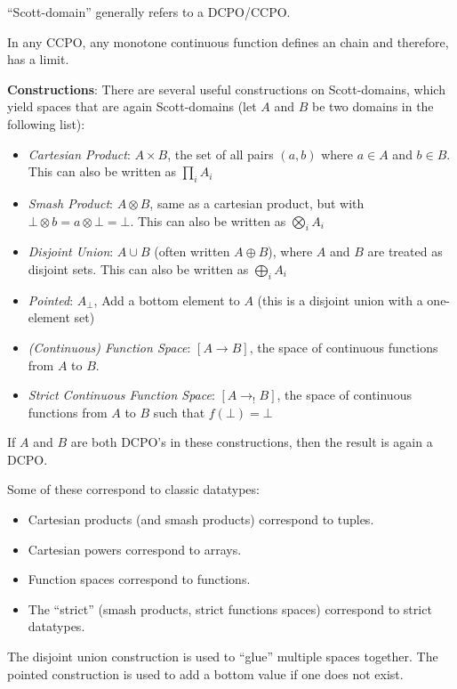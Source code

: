 \documentclass{article}
\begin{document}
``Scott-domain'' generally refers to a DCPO/CCPO.

In any CCPO, any monotone continuous function defines an chain and
therefore, has a limit.

\textbf{Constructions}: There are several useful
constructions on Scott-domains, which yield spaces that are again
Scott-domains (let $A$ and $B$ be two domains in the following list):
\begin{itemize}
  \item \emph{Cartesian Product}: $A \times B$, the set of all pairs
    $(a, b)$ where $a\in A$ and $b\in B$.  This can also be written as
    $\prod_iA_i$
  \item \emph{Smash Product}: $A \otimes B$, same as a cartesian
    product, but with $\bot \otimes b = a \otimes \bot = \bot$.  This
    can also be written as $\bigotimes_iA_i$
  \item \emph{Disjoint Union}: $A \cup B$ (often written $A \oplus
    B$), where $A$ and $B$ are treated as disjoint
    sets.  This can also be written as $\bigoplus_iA_i$
  \item \emph{Pointed}: $A_{\bot}$, Add a bottom element to $A$ (this
    is a disjoint union with a one-element set)
  \item \emph{(Continuous) Function Space}: $[A \rightarrow B]$, the
    space of continuous functions from $A$ to $B$.
  \item \emph{Strict Continuous Function Space}: $[A \rightarrow_{!} B]$,
    the space of continuous functions from $A$ to $B$ such that
    $f(\bot) = \bot$
\end{itemize}
If $A$ and $B$ are both DCPO's in these constructions, then the result
is again a DCPO.

Some of these correspond to classic datatypes:
\begin{itemize}
  \item Cartesian products (and smash products) correspond to tuples.
  \item Cartesian powers correspond to arrays.
  \item Function spaces correspond to functions.
  \item The ``strict'' (smash products, strict functions spaces)
    correspond to strict datatypes.
\end{itemize}

The disjoint union construction is used to ``glue'' multiple spaces
together.  The pointed construction is used to add a bottom value if
one does not exist.
\end{document}
